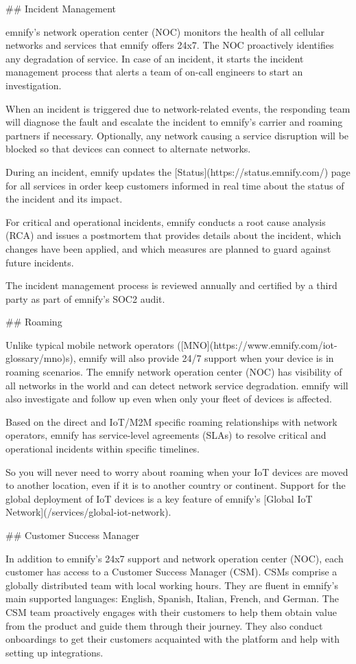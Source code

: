 \documentclass[11pt, oneside]{article}   	%
\begin{document}
\begin{markdown}

## Incident Management

emnify's network operation center (NOC) monitors the health of all cellular networks and services that emnify offers 24x7.
The NOC proactively identifies any degradation of service.
In case of an incident, it starts the incident management process that alerts a team of on-call engineers to start an investigation.

When an incident is triggered due to network-related events, the responding team will diagnose the fault and escalate the incident to emnify's carrier and roaming partners if necessary.
Optionally, any network causing a service disruption will be blocked so that devices can connect to alternate networks.

During an incident, emnify updates the [Status](https://status.emnify.com/) page for all services in order keep customers informed in real time about the status of the incident and its impact.

For critical and operational incidents, emnify conducts a root cause analysis (RCA) and issues a postmortem that provides details about the incident, which changes have been applied, and which measures are planned to guard against future incidents.

The incident management process is reviewed annually and certified by a third party as part of emnify's SOC2 audit.

## Roaming

Unlike typical mobile network operators ([MNO](https://www.emnify.com/iot-glossary/mno)s), emnify will also provide 24/7 support when your device is in roaming scenarios.
The emnify network operation center (NOC) has visibility of all networks in the world and can detect network service degradation. 
emnify will also investigate and follow up even when only your fleet of devices is affected.

Based on the direct and IoT/M2M specific roaming relationships with network operators, emnify has service-level agreements (SLAs) to resolve critical and operational incidents within specific timelines.

So you will never need to worry about roaming when your IoT devices are moved to another location, even if it is to another country or continent.
Support for the global deployment of IoT devices is a key feature of emnify's [Global IoT Network](/services/global-iot-network).

## Customer Success Manager

In addition to emnify's 24x7 support and network operation center (NOC), each customer has access to a Customer Success Manager (CSM).
CSMs comprise a globally distributed team with local working hours.
They are fluent in emnify's main supported languages: English, Spanish, Italian, French, and German.
The CSM team proactively engages with their customers to help them obtain value from the product and guide them through their journey.
They also conduct onboardings to get their customers acquainted with the platform and help with setting up integrations.

\end{markdown}
\end{document}
